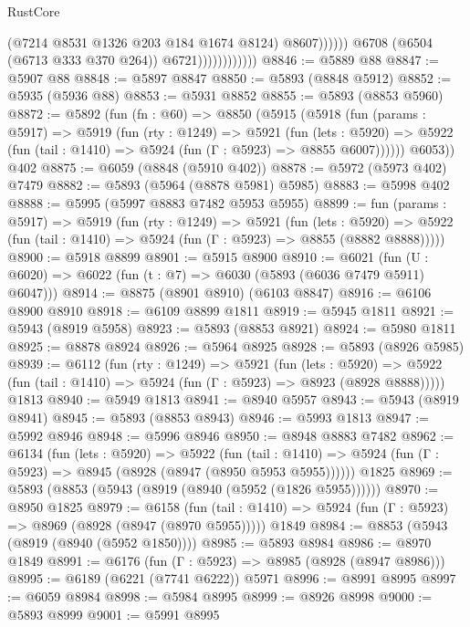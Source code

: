 \begin{lexlean}{RustCore}
\begin{coremodule}
                                        (@7214 @8531 @1326 @203 @184 @1674 @8124)
                                        @8607))))))
                            @6708
                            (@6504 (@6713 @333 @370 @264))
                            @6721))))))))))))
@8846 := @5889 @88
@8847 := @5907 @88
@8848 := @5897 @8847
@8850 := @5893 (@8848 @5912)
@8852 := @5935 (@5936 @88)
@8853 := @5931 @8852
@8855 := @5893 (@8853 @5960)
@8872 := @5892
    (fun (fn : @60) =>
    @8850
      (@5915
        (@5918
          (fun (params : @5917) =>
          @5919
            (fun (rty : @1249) =>
            @5921
              (fun (lets : @5920) =>
              @5922 (fun (tail : @1410) => @5924 (fun (Γ : @5923) => @8855 @6007))))))
        @6053))
    @402
@8875 := @6059 (@8848 (@5910 @402))
@8878 := @5972 (@5973 @402) @7479
@8882 := @5893 (@5964 (@8878 @5981) @5985)
@8883 := @5998 @402
@8888 := @5995 (@5997 @8883 @7482 @5953 @5955)
@8899 := fun (params : @5917) =>
  @5919
    (fun (rty : @1249) =>
    @5921
      (fun (lets : @5920) =>
      @5922 (fun (tail : @1410) => @5924 (fun (Γ : @5923) => @8855 (@8882 @8888)))))
@8900 := @5918 @8899
@8901 := @5915 @8900
@8910 := @6021 (fun (U : @6020) => @6022 (fun (t : @7) => @6030 (@5893 (@6036 @7479 @5911) @6047)))
@8914 := @8875 (@8901 @8910) (@6103 @8847)
@8916 := @6106 @8900 @8910
@8918 := @6109 @8899 @1811
@8919 := @5945 @1811
@8921 := @5943 (@8919 @5958)
@8923 := @5893 (@8853 @8921)
@8924 := @5980 @1811
@8925 := @8878 @8924
@8926 := @5964 @8925
@8928 := @5893 (@8926 @5985)
@8939 := @6112
    (fun (rty : @1249) =>
    @5921
      (fun (lets : @5920) =>
      @5922 (fun (tail : @1410) => @5924 (fun (Γ : @5923) => @8923 (@8928 @8888)))))
    @1813
@8940 := @5949 @1813
@8941 := @8940 @5957
@8943 := @5943 (@8919 @8941)
@8945 := @5893 (@8853 @8943)
@8946 := @5993 @1813
@8947 := @5992 @8946
@8948 := @5996 @8946
@8950 := @8948 @8883 @7482
@8962 := @6134
    (fun (lets : @5920) =>
    @5922
      (fun (tail : @1410) => @5924 (fun (Γ : @5923) => @8945 (@8928 (@8947 (@8950 @5953 @5955))))))
    @1825
@8969 := @5893 (@8853 (@5943 (@8919 (@8940 (@5952 (@1826 @5955))))))
@8970 := @8950 @1825
@8979 := @6158
    (fun (tail : @1410) => @5924 (fun (Γ : @5923) => @8969 (@8928 (@8947 (@8970 @5955)))))
    @1849
@8984 := @8853 (@5943 (@8919 (@8940 (@5952 @1850))))
@8985 := @5893 @8984
@8986 := @8970 @1849
@8991 := @6176 (fun (Γ : @5923) => @8985 (@8928 (@8947 @8986)))
@8995 := @6189 (@6221 (@7741 @6222)) @5971
@8996 := @8991 @8995
@8997 := @6059 @8984
@8998 := @5984 @8995
@8999 := @8926 @8998
@9000 := @5893 @8999
@9001 := @5991 @8995

\end{coremodule}
\end{lexlean}

